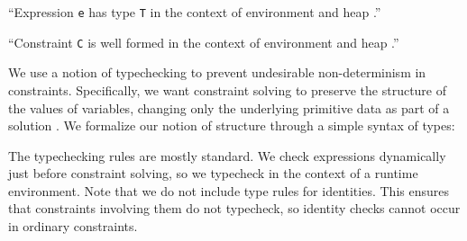 




``Expression \texttt{e} has type \texttt{T} in the context of environment
\texttt{\Euid} and heap \Huid.''

``Constraint \texttt{C} is well formed in the context of environment
\texttt{\Euid} and heap \Huid.''

We use a notion of typechecking to prevent undesirable non-determinism
in constraints.  Specifically, we want constraint solving to preserve
the structure of the values of variables, changing only the underlying
primitive data as part of a solution%
.  We formalize our notion of
structure through a simple syntax of types:
\baselineskip{}
\baselineskip

The typechecking rules are mostly standard. We check expressions
dynamically just before constraint solving, so we typecheck in the
context of a runtime environment. Note that we do not include type
rules for identities. This ensures that constraints involving them do
not typecheck, so identity checks cannot occur in ordinary
constraints.


